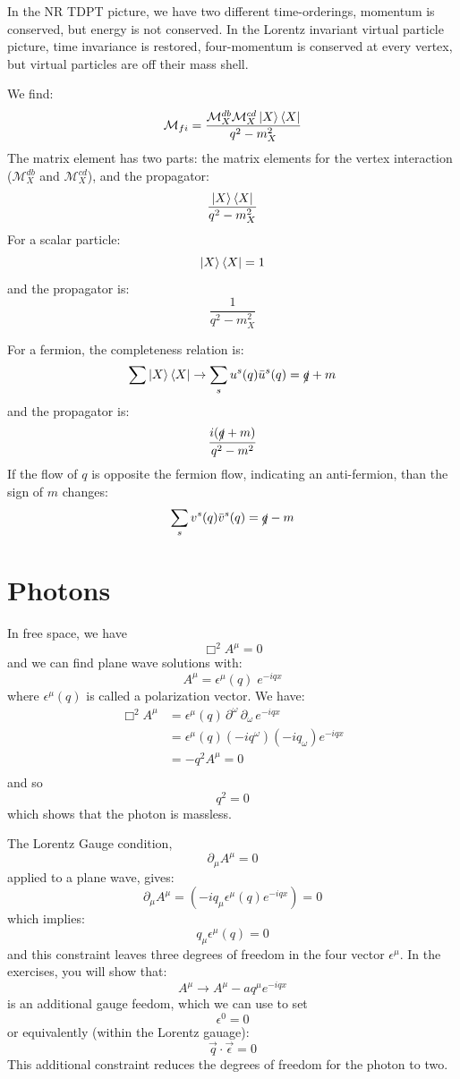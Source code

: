\documentclass[12pt]{article}
\begin{document}
In the NR TDPT picture, we have two different time-orderings, momentum
is conserved, but energy is not conserved.  In the Lorentz invariant
virtual particle picture, time invariance is restored, four-momentum
is conserved at every vertex, but virtual particles are off their mass
shell.

We find:
\begin{equation}
\mathcal{M}_{fi} = \frac{\mathcal{M}^{db}_X \mathcal{M}^{cd}_X \ket{X}\bra{X}}{q^2 - m_X^2}
\end{equation}
The matrix element has two parts:  the matrix elements for the vertex interaction 
($\mathcal{M}^{db}_X$ and $\mathcal{M}^{cd}_X$), and the propagator:
$$\frac{\ket{X}\bra{X}}{q^2 - m_X^2}$$
For a scalar particle:
$$\ket{X}\bra{X} = 1$$
and the propagator is:
$$\frac{1}{q^2 - m_X^2}$$  

For a fermion, the completeness relation is:
$$\sum \ket{X}\bra{X} \to \sum_s u^s(q)\bar{u}^s(q) = \slashed{q} + m$$
and the propagator is:
$$\frac{i(\slashed{q} + m)}{q^2 - m^2}$$
If the flow of $q$ is opposite the fermion flow, indicating an anti-fermion, than the sign of $m$ changes:
$$\sum_s v^s(q)\bar{v}^s(q) = \slashed{q} - m$$

\section{Photons}

In free space, we have
$$\Box^2 A^\mu = 0$$
and we can find plane wave solutions with:
$$A^\mu = \epsilon^\mu(q) \; e^{-iqx}$$
where $\epsilon^\mu(q)$ is called a polarization vector. We have:
\begin{align*}
\Box^2 A^\mu &= \epsilon^\mu(q) \, \partial^\omega \, \partial_\omega \, e^{-iqx} \\
&= \epsilon^\mu(q) (-iq^\omega) (-i q_\omega) e^{-iqx} \\
&= -q^2 A^\mu = 0 \\
\end{align*}
and so
$$q^2 = 0$$
which shows that the photon is massless.

The Lorentz Gauge condition, 
$$\partial_\mu A^\mu = 0$$
applied to a plane wave, gives:
$$\partial_\mu A^\mu = (-i q_\mu \epsilon^\mu(q) e^{-iqx}) = 0$$
which implies:
$$q_\mu \epsilon^\mu(q) = 0$$
and this constraint leaves three degrees of freedom in the four vector $\epsilon^\mu$.
In the exercises, you will show that:
$$A^\mu \to A^\mu - a q^\mu e^{-iqx}$$
is an additional gauge feedom, which we can use to set
$$\epsilon^0 = 0$$
or equivalently (within the Lorentz gauage):
$$\vec{q} \cdot \vec{\epsilon} = 0$$
This additional constraint reduces the degrees of freedom for the
photon to two.\\[5pt]
\end{document}
